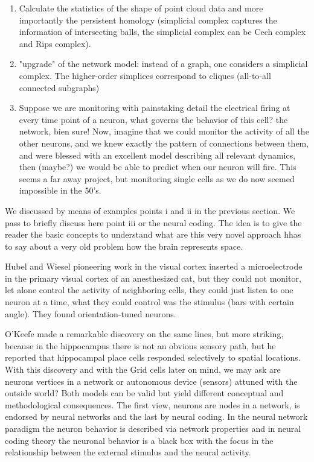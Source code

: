 \documentclass[onecollarge,runningheads]{svjour2}
\begin{document}
\begin{enumerate}
\item  Calculate the statistics of the shape of point cloud data and more importantly the persistent homology (simplicial complex captures the information of intersecting balls, the simplicial complex can be Cech complex and Rips complex).
\item  "upgrade" of the network model: instead of a graph, one considers a simplicial complex. The higher-order simplices correspond to cliques (all-to-all connected subgraphs)
\item Suppose we are monitoring with painstaking detail the electrical firing at every time point of a neuron, what governs the behavior of this cell? the network, bien sure!  Now, imagine that we could monitor the activity of all the other neurons, and we knew exactly the pattern of connections between them, and were blessed with an excellent model describing all relevant dynamics, then (maybe?) we would be able to predict when our neuron will fire. This seems a far away project, but monitoring  single cells as we do now seemed impossible in the 50's. %
\end{enumerate}

We discussed by means of examples points i and ii in the previous section. We pass to briefly  discuss here point iii or the neural coding. The idea is to give the reader the basic concepts  to understand what are this very novel approach hhas to say about a very old problem how the brain represents space.
 
Hubel and Wiesel pioneering work in the visual cortex inserted a microelectrode in the primary visual cortex of an anesthesized cat, but they could not monitor, let alone control the activity of neighboring cells, they could just listen to one neuron at a time, what they could control was the stimulus (bars with certain angle). They found orientation-tuned neurons.

O'Keefe made a remarkable discovery on the same lines, but more striking, because in the hippocampus there is not an obvious sensory path, but he reported that hippocampal place cells responded selectively to spatial locations.
With this discovery and with the Grid cells later on mind, we may ask are neurons vertices in a network or autonomous device (sensors) attuned with the outside world? Both models can be valid but yield different conceptual and methodological consequences. The first view, neurons are nodes in a network, is endorsed by neural networks and the last by neural coding. In the neural network paradigm the neuron behavior is described via network properties and in neural coding theory the neuronal behavior is a black box with the focus in the relationship between the external stimulus and the neural activity.
\end{document}
